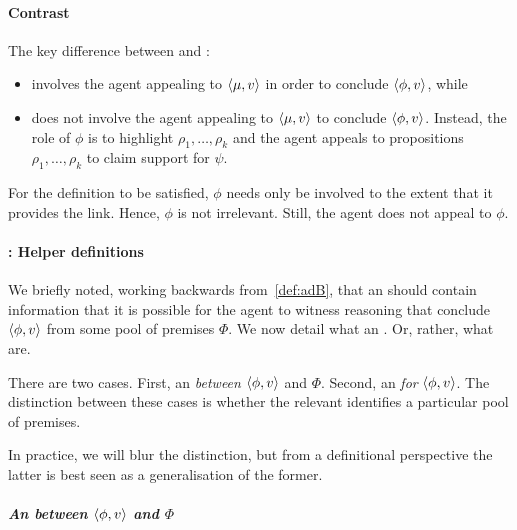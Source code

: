 \paragraph*{Contrast}

\begin{note}
  The key difference between \adA{} and \adB{}:
  \begin{itemize}
  \item \adA{} involves the agent appealing to \(\langle \mu, v \rangle\) in order to conclude \(\langle \phi, v \rangle\), while
  \item \adB{} does not involve the agent appealing to \(\langle \mu, v \rangle\) to conclude \(\langle \phi, v \rangle\).
    Instead, the role of \(\phi\) is to highlight \(\rho_{1},\dots,\rho_{k}\) and the agent appeals to propositions \(\rho_{1},\dots,\rho_{k}\) to claim support for \(\psi\).
  \end{itemize}

  For the definition to be satisfied, \(\phi\) needs only be involved to the extent that it provides the link.
  Hence, \(\phi\) is not irrelevant.
  Still, the agent does not appeal to \(\phi\).
\end{note}

\paragraph*{\adB{}: Helper definitions}

\begin{note}[]
  We briefly noted, working backwards from~\autoref{def:adB}, that an \itp{} should contain information that it is possible for the agent to witness reasoning that conclude \(\langle \phi, v \rangle\) from some pool of premises \(\Phi\).
  We now detail what an .
  Or, rather, what  are.

  There are two cases.
  First, an  \emph{between} \(\langle \phi, v \rangle\) and \(\Phi\).
  Second, an  \emph{for} \(\langle \phi, v \rangle\).
  The distinction between these cases is whether the relevant  identifies a particular pool of premises.

  In practice, we will blur the distinction, but from a definitional perspective the latter is best seen as a generalisation of the former.
\end{note}

\subparagraph*{An  between \(\langle \phi, v \rangle\) and \(\Phi\)}

